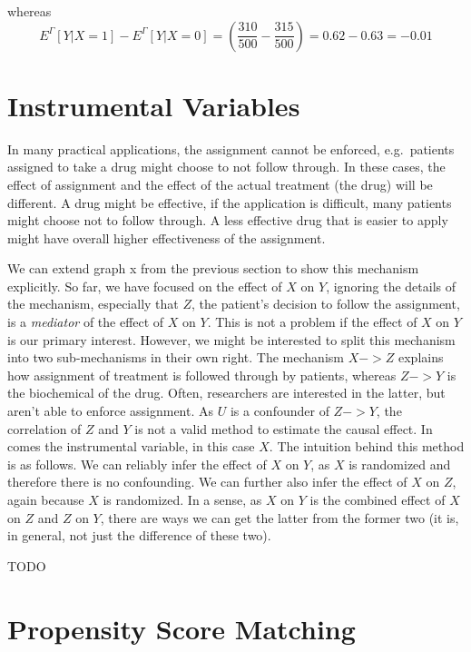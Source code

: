 \documentclass[
]{book}
\theoremstyle{definition}
\theoremstyle{definition}
\theoremstyle{definition}
\theoremstyle{remark}
\begin{document}
whereas
\begin{equation}
E^{\Gamma}[Y | X = 1] - E^{\Gamma}[Y | X = 0] = (\frac{310}{500} - \frac{315}{500}) = 0.62 - 0.63 = -0.01
\end{equation}

\hypertarget{instrumental-variables}{%
\section{Instrumental Variables}\label{instrumental-variables}}

In many practical applications, the assignment cannot be enforced, e.g.~patients assigned to take a drug might choose to not follow through. In these cases, the effect of assignment and the effect of the actual treatment (the drug) will be different. A drug might be effective, if the application is difficult, many patients might choose not to follow through. A less effective drug that is easier to apply might have overall higher effectiveness of the assignment.

We can extend graph x from the previous section to show this mechanism explicitly. So far, we have focused on the effect of \(X\) on \(Y\), ignoring the details of the mechanism, especially that \(Z\), the patient's decision to follow the assignment, is a \emph{mediator} of the effect of \(X\) on \(Y\). This is not a problem if the effect of \(X\) on \(Y\) is our primary interest. However, we might be interested to split this mechanism into two sub-mechanisms in their own right. The mechanism \(X -> Z\) explains how assignment of treatment is followed through by patients, whereas \(Z -> Y\) is the biochemical of the drug. Often, researchers are interested in the latter, but aren't able to enforce assignment. As \(U\) is a confounder of \(Z -> Y\), the correlation of \(Z\) and \(Y\) is not a valid method to estimate the causal effect. In comes the instrumental variable, in this case \(X\).
The intuition behind this method is as follows. We can reliably infer the effect of \(X\) on \(Y\), as \(X\) is randomized and therefore there is no confounding. We can further also infer the effect of \(X\) on \(Z\), again because \(X\) is randomized. In a sense, as \(X\) on \(Y\) is the combined effect of \(X\) on \(Z\) and \(Z\) on \(Y\), there are ways we can get the latter from the former two (it is, in general, not just the difference of these two).

TODO

\hypertarget{propensity-score-matching}{%
\section{Propensity Score Matching}\label{propensity-score-matching}}
\end{document}
